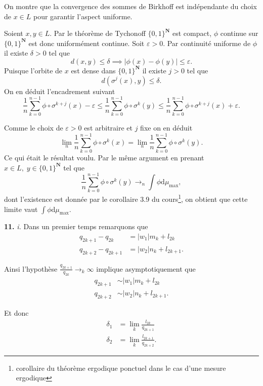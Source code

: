 \documentclass[12pt]{article}
\newcommand{\N}{\mathbf{N}}
\newcommand{\de}{\mathrm{d}}
\begin{document}
On montre que la convergence des sommes de Birkhoff est indépendante du choix de $x \in L$ pour garantir l'aspect uniforme.

Soient $x, y \in L$. Par le théorème de Tychonoff $\{0,1\}^{\N}$ est compact, $\phi$ continue sur $\{0,1\}^{\N}$ est donc uniformément continue.
Soit $\varepsilon > 0$. Par continuité uniforme de $\phi$ il existe  $\delta > 0$ tel que  \[
        d(x,y) \le \delta \implies |\phi(x)-\phi(y)| \le \varepsilon
.\] Puisque l'orbite de $x$ est dense dans $\{0,1\}^{\N}$ il existe $j > 0$ tel que \[
d(\sigma^{j}(x), y) \le \delta
.\] 
On en déduit l'encadrement suivant \[
        \frac{1}{n}\sum_{k=0}^{n-1} \phi\circ\sigma^{k+j}(x) - \varepsilon \le \frac{1}{n}\sum_{k=0}^{n-1} \phi\circ\sigma^{k}(y) \le \frac{1}{n}\sum_{k=0}^{n-1} \phi\circ\sigma^{k+j}(x) + \varepsilon 
.\] 

Comme le choix de $\varepsilon > 0$ est arbitraire et $j$ fixe on en déduit  \[
\lim_{n}\frac{1}{n}\sum_{k=0}^{n-1} \phi\circ\sigma^{k}(x) =  \lim_{n}\frac{1}{n}\sum_{k=0}^{n-1} \phi\circ\sigma^{k}(y)
.\] Ce qui était le résultat voulu. Par le même argument en prenant $x \in L, \; y \in \{0,1\}^{\N}$ tel que \[
\frac{1}{n}\sum_{k=0}^{n-1} \phi\circ\sigma^{k}(y) \to_{n}\int\phi\de\mu_{\max}
,\] dont l'existence est donnée par le corollaire 3.9 du cours\footnote{corollaire du théorème ergodique ponctuel dans le cas d'une mesure ergodique}, on obtient que cette limite vaut $\int\phi\de\mu_{\max}$.

\medskip

\textbf{11.} \textit{i.} Dans un premier temps remarquons que
\begin{align*}
        q_{2k+1}-q_{2k} &= |w_{1}|m_{k}+l_{2k} \\
        q_{2k+2}-q_{2k+1} &= |w_{2}|n_{k}+l_{2k+1}
.\end{align*}

Ainsi l'hypothèse $\frac{q_{2k+1}}{q_{2k}} \to_{k} \infty$ implique asymptotiquement que
\begin{align*}
        q_{2k+1} &\sim |w_{1}|m_{k}+l_{2k} \\
        q_{2k+2} &\sim |w_{2}|n_{k}+l_{2k+1}
.\end{align*}

Et donc
\begin{align*}
        \delta_{1} &= \lim_{k} \frac{l_{2k}}{q_{2k+1}} \\
        \delta_{2} &= \lim_{k} \frac{l_{2k+1}}{q_{2k+2}}
.\end{align*}
\end{document}
